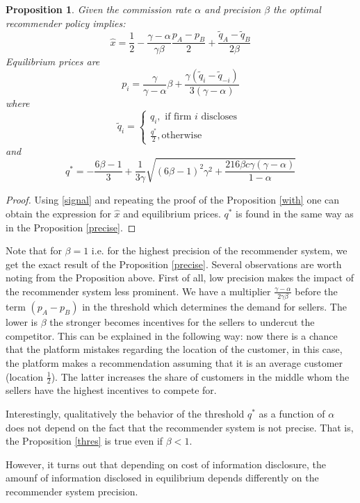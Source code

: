 \documentclass[a4paper]{article}
\newtheorem{proposition}[theorem]{Proposition}
\begin{document}
\begin{proposition}\label{notprecise}
	Given the commission rate $\alpha$ and precision $\beta$ the optimal recommender policy implies:
	$$\hat{x} = \frac{1}{2} - \frac{\gamma - \alpha}{\gamma \beta} \frac{p_A-p_B}{2} + \frac{\tilde{q}_A - \tilde{q}_B}{2 \beta}$$
	Equilibrium prices are
	$$p_i = \frac{\gamma}{\gamma - \alpha} \beta + \frac{\gamma(\tilde{q}_i - \tilde{q}_{-i})}{3(\gamma - \alpha)}$$
	where
	$$\tilde{q}_i = \begin{cases}
	q_i, \text{ if firm }i\text{ discloses }\\
	\frac{q^*}{2}, \text{otherwise}
	\end{cases}$$
	and $$q^* = -\frac{6 \beta - 1}{3} + \frac{1}{3 \gamma} \sqrt{(6 \beta - 1)^2\gamma^2 + \frac{216 \beta c \gamma (\gamma - \alpha)}{1-\alpha}}$$
\end{proposition}
\begin{proof}
	Using \eqref{signal} and repeating the proof of the Proposition \ref{with} one can obtain the expression for $\hat{x}$ and equilibrium prices. $q^*$ is found in the same way as in the Proposition \ref{precise}.
\end{proof}
Note that for $\beta = 1$ i.e. for the highest precision of the recommender system, we get the exact result of the Proposition \ref{precise}. Several observations are worth noting from the Proposition above. First of all, low precision makes the impact of the recommender system less prominent. We have a multiplier $\frac{\gamma - \alpha}{2 \gamma \beta}$ before the term $(p_A - p_B)$ in the threshold which determines the demand for sellers. The lower is $\beta$ the stronger becomes incentives for the sellers to undercut the competitor. This can be explained in the following way: now there is a chance that the platform mistakes regarding the location of the customer, in this case, the platform makes a recommendation assuming that it is an average customer (location $\frac{1}{2}$). The latter increases the share of customers in the middle whom the sellers have the highest incentives to compete for.




Interestingly, qualitatively the behavior of the threshold $q^*$ as a function of $\alpha$ does not depend on the fact that the recommender system is not precise. That is, the Proposition \ref{thres} is true even if $\beta < 1$.


However, it turns out that depending on cost of information disclosure, the amounf of information disclosed in equilibrium depends differently on the recommender system precision.
\end{document}
